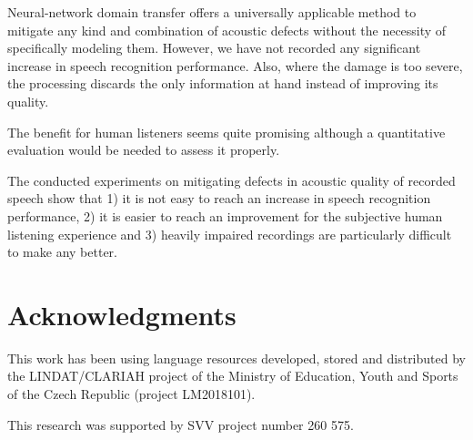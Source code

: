 \documentclass[runningheads]{llncs}
\begin{document}
Neural-network domain transfer offers a universally applicable method to
mitigate any kind and combination of acoustic defects without the necessity
of specifically modeling them. However,
we have not recorded any significant increase in speech recognition performance.
Also, where the damage is too severe, the processing discards the only
information at hand instead of improving its quality.

The benefit for human listeners seems quite promising although a quantitative
evaluation would be needed to assess it properly.

The conducted experiments on mitigating defects in acoustic quality of recorded speech
show that 1) it is not easy to reach an increase in speech recognition
performance, 2) it is easier to reach an improvement for the subjective
human listening experience and 3) heavily impaired recordings are particularly difficult to
make any better.

\section*{Acknowledgments}

This work has been using language resources developed, stored and distributed by
the LINDAT/CLARIAH project of the Ministry of Education, Youth and Sports of the
Czech Republic (project LM2018101).

This research was supported by SVV project number 260 575.




\end{document}
